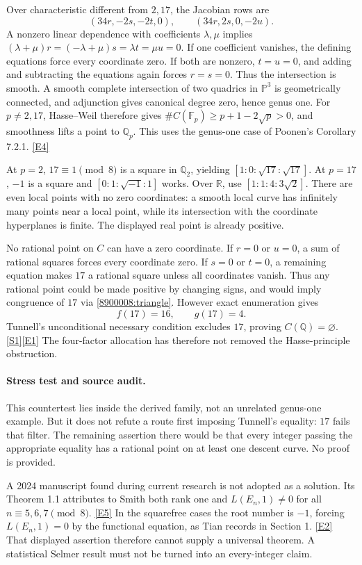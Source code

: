 \documentclass[11pt,a4paper]{article}
\newcommand{\Q}{\mathbb{Q}}
\newcommand{\R}{\mathbb{R}}
\newcommand{\F}{\mathbb{F}}
\newcommand{\PP}{\mathbb P}
\newcommand{\sref}[2]{\hyperlink{source:#1:#2}{[S#2]}}
\newcommand{\eref}[2]{\hyperlink{extra:#1:#2}{[E#2]}}
\numberwithin{equation}{section}
\begin{document}
Over characteristic different from $2,17$, the Jacobian rows are
\[
 (34r,-2s,-2t,0),\qquad(34r,2s,0,-2u).
\]
A nonzero linear dependence with coefficients $\lambda,\mu$ implies
$(\lambda+\mu)r=(-\lambda+\mu)s=\lambda t=\mu u=0$.
If one coefficient vanishes, the defining equations force every coordinate
zero. If both are nonzero, $t=u=0$, and adding and subtracting the equations
again forces $r=s=0$. Thus the intersection is smooth. A smooth complete
intersection of two quadrics in $\PP^3$ is geometrically connected, and
adjunction gives canonical degree zero, hence genus one.
For $p\ne2,17$, Hasse--Weil therefore gives
$\#C(\F_p)\ge p+1-2\sqrt p>0$, and smoothness lifts a point to $\Q_p$.
This uses the genus-one case of Poonen's Corollary 7.2.1. \eref{8900008}{4}

At $p=2$, $17\equiv1\pmod8$ is a square in $\Q_2$, yielding
$[1:0:\sqrt{17}:\sqrt{17}]$. At $p=17$, $-1$ is a square and
$[0:1:\sqrt{-1}:1]$ works. Over $\R$, use $[1:1:4:3\sqrt2]$.
There are even local points with no zero coordinates: a smooth local curve
has infinitely many points near a local point, while its intersection with
the coordinate hyperplanes is finite. The displayed real point is already
positive.

No rational point on $C$ can have a zero coordinate. If $r=0$ or $u=0$,
a sum of rational squares forces every coordinate zero. If $s=0$ or $t=0$,
a remaining equation makes $17$ a rational square unless all coordinates
vanish. Thus any rational point could be made positive by changing signs,
and would imply congruence of $17$ via \eqref{8900008:triangle}. However exact
enumeration gives
\[
 f(17)=16,\qquad g(17)=4.
\]
Tunnell's unconditional necessary condition excludes $17$, proving
$C(\Q)=\varnothing$. \sref{8900008}{1}\eref{8900008}{1} The four-factor allocation
has therefore not removed the Hasse-principle obstruction.

\paragraph{Stress test and source audit.}
This countertest lies inside the derived family, not an unrelated genus-one
example. But it does not refute a route first imposing Tunnell's equality:
$17$ fails that filter. The remaining assertion there would be that every
integer passing the appropriate equality has a rational point on at least
one descent curve. No proof is provided.

A 2024 manuscript found during current research is not adopted as a solution.
Its Theorem 1.1 attributes to Smith both rank one and $L(E_n,1)\ne0$ for
all $n\equiv5,6,7\pmod8$. \eref{8900008}{5} In the squarefree cases the root
number is $-1$, forcing $L(E_n,1)=0$ by the functional equation, as Tian
records in Section 1. \eref{8900008}{2} That displayed assertion therefore
cannot supply a universal theorem. A statistical Selmer result must not be
turned into an every-integer claim.
\end{document}
